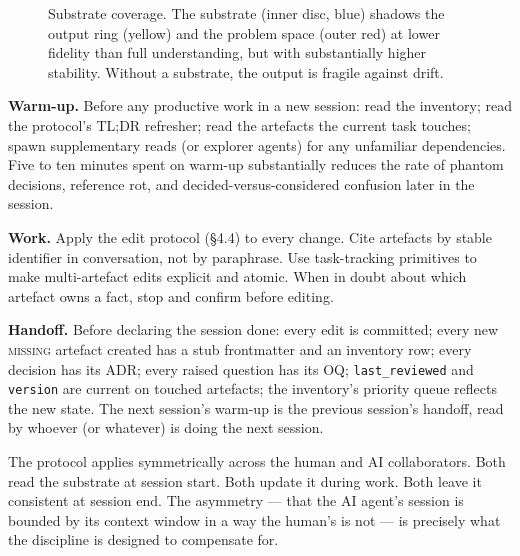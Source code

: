 \documentclass[11pt,a4paper,twocolumn]{article}
\begin{document}
\begin{figure}[t]
\centering
{}
\caption{Substrate coverage. The substrate (inner disc, blue)
shadows the output ring (yellow) and the problem space (outer red)
at lower fidelity than full understanding, but with substantially
higher stability. Without a substrate, the output is fragile
against drift.}
\label{fig:substrate}
\end{figure}

\textbf{Warm-up.} Before any productive work in a new session: read
the inventory; read the protocol's TL;DR refresher; read the
artefacts the current task touches; spawn supplementary reads (or
explorer agents) for any unfamiliar dependencies. Five to ten
minutes spent on warm-up substantially reduces the rate of phantom
decisions, reference rot, and decided-versus-considered confusion
later in the session.

\textbf{Work.} Apply the edit protocol (\S4.4) to every change.
Cite artefacts by stable identifier in conversation, not by
paraphrase. Use task-tracking primitives to make multi-artefact
edits explicit and atomic. When in doubt about which artefact owns
a fact, stop and confirm before editing.

\textbf{Handoff.} Before declaring the session done: every edit is
committed; every new \textsc{missing} artefact created has a stub
frontmatter and an inventory row; every decision has its ADR;
every raised question has its OQ; \texttt{last\_reviewed} and
\texttt{version} are current on touched artefacts; the inventory's
priority queue reflects the new state. The next session's warm-up
is the previous session's handoff, read by whoever (or whatever)
is doing the next session.

The protocol applies symmetrically across the human and AI
collaborators. Both read the substrate at session start. Both
update it during work. Both leave it consistent at session end.
The asymmetry --- that the AI agent's session is bounded by its
context window in a way the human's is not --- is precisely what
the discipline is designed to compensate for.
\end{document}
